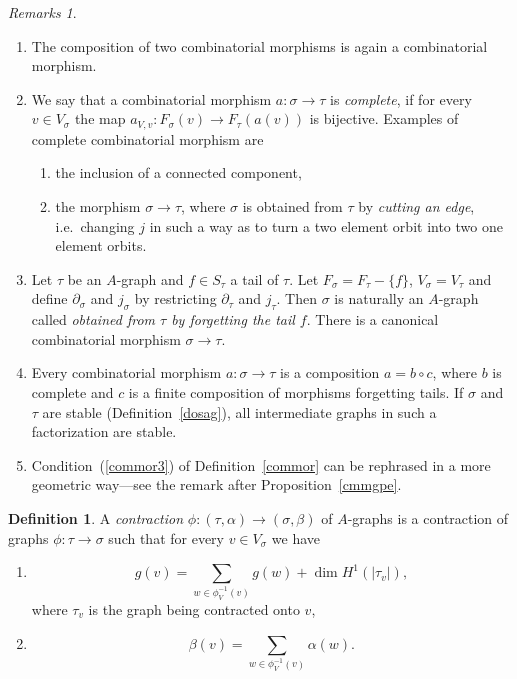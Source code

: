 \documentclass[11pt]{amsart}
\theoremstyle{definition}
\newtheorem{defn}[prop]{Definition}
\theoremstyle{remark}
\newtheorem{rmks}{Remarks}\renewcommand{\thermks}{}
\newcommand{\del}{\partial}
\newcommand{\comp}{\mathbin{{\scriptstyle\circ}}}
\renewcommand{\t}{_{\tau}}
\newcommand{\s}{_{\sigma}}
\theoremstyle{plain}
\theoremstyle{definition}
\theoremstyle{remark}
\begin{document}
\begin{rmks}
\begin{enumerate}
\item The composition of two combinatorial morphisms is again a combinatorial
morphism.
\item We say that a combinatorial morphism \(a:\sigma\rightarrow\tau\) is {\em
complete}, if for every \(v\in V\s\) the map
\(a_{V,v}:F\s(v)\rightarrow F\t(a(v))\) is bijective. Examples of complete
combinatorial morphism are
\begin{enumerate}
\item the inclusion of a connected component,
\item the morphism \(\sigma\rightarrow\tau\), where \(\sigma\) is obtained from
\(\tau\) by {\em cutting an edge}, i.e.\
changing \(j\) in such a way as to turn a two element orbit into two one element
orbits.
\end{enumerate}
\item Let \(\tau\) be an \(A\)-graph and \(f\in S\t\) a tail of \(\tau\). Let
\(F\s=F\t-\{f\}\), \(V\s=V\t\) and define \(\del\s\) and
\(j\s\) by restricting \(\del\t\) and \(j\t\). Then \(\sigma\) is naturally an
\(A\)-graph called {\em obtained from \(\tau\) by
forgetting the tail \(f\)}. There is a canonical combinatorial morphism
\(\sigma\rightarrow\tau\).
\item Every combinatorial morphism \(a:\sigma\rightarrow\tau\) is a composition
\(a=b\comp c\), where \(b\) is complete and
\(c\) is a finite composition of morphisms forgetting tails. If \(\sigma\) and
\(\tau\) are stable (Definition~\ref{dosag}),
all intermediate graphs in such a factorization are stable.
\item Condition~(\ref{commor3}) of Definition~\ref{commor} can be rephrased in
a more geometric way---see the remark
after Proposition~\ref{cmmgpe}.
\end{enumerate}
\end{rmks}

\begin{defn}
A {\em contraction }\(\phi:(\tau,\alpha)\rightarrow(\sigma,\beta)\) of \(A\)-graphs
is a contraction of graphs
\(\phi:\tau\rightarrow\sigma\) such that for every \(v\in V\s\) we have
\begin{enumerate}
\item
\[
g(v)=\sum_{w\in\phi_V^{-1}(v)}g(w)+\dim H^1(|\tau_v|),
\]
where \(\tau_v\) is the graph being contracted onto \(v\),
\item
\[
\beta(v)=\sum_{w\in\phi_V^{-1}(v)}\alpha(w).
\]
\end{enumerate}
\end{defn}
\end{document}
